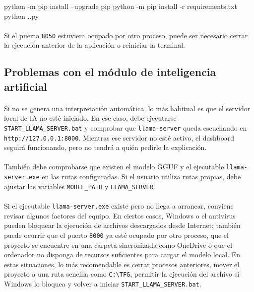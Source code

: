 \begin{bloquecomando}
python -m pip install --upgrade pip
python -m pip install -r requirements.txt
python .\cargaDataset.py
\end{bloquecomando}

\paragraph*{}Si el puerto \texttt{8050} estuviera ocupado por otro proceso, puede ser necesario cerrar la ejecución anterior de la aplicación o reiniciar la terminal.

\subsection{Problemas con el módulo de inteligencia artificial}

\paragraph*{}Si no se genera una interpretación automática, lo más habitual es que el servidor local de IA no esté iniciado. En ese caso, debe ejecutarse \texttt{START\_LLAMA\_SERVER.bat} y comprobar que \texttt{llama-server} queda escuchando en \texttt{http://127.0.0.1:8000}. Mientras ese servidor no esté activo, el dashboard seguirá funcionando, pero no tendrá a quién pedirle la explicación.

\paragraph*{}También debe comprobarse que existen el modelo GGUF y el ejecutable \texttt{llama-server.exe} en las rutas configuradas. Si el usuario utiliza rutas propias, debe ajustar las variables \texttt{MODEL\_PATH} y \texttt{LLAMA\_SERVER}.

\paragraph*{}Si el ejecutable \texttt{llama-server.exe} existe pero no llega a arrancar, conviene revisar algunos factores del equipo. En ciertos casos, Windows o el antivirus pueden bloquear la ejecución de archivos descargados desde Internet; también puede ocurrir que el puerto \texttt{8000} ya esté ocupado por otro proceso, que el proyecto se encuentre en una carpeta sincronizada como OneDrive o que el ordenador no disponga de recursos suficientes para cargar el modelo local. En estas situaciones, lo más recomendable es cerrar procesos anteriores, mover el proyecto a una ruta sencilla como \texttt{C:\textbackslash TFG}, permitir la ejecución del archivo si Windows lo bloquea y volver a iniciar \texttt{START\_LLAMA\_SERVER.bat}.

